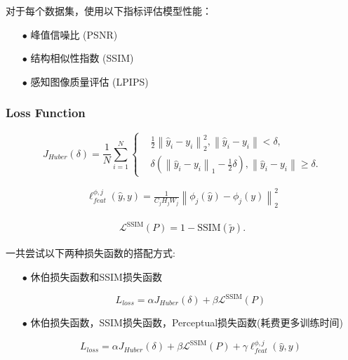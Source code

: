 \documentclass[a4paper, 10pt]{article}
\begin{document}
		对于每个数据集，使用以下指标评估模型性能：
		
		\begin{itemize}
			\item[$\bullet$]
			峰值信噪比 (PSNR)
			\item[$\bullet$]
			结构相似性指数 (SSIM)
			\item[$\bullet$]
			感知图像质量评估 (LPIPS)
		\end{itemize}
				
		\subsubsection{Loss Function}
		
		\begin{equation}
			J_{Huber}(\delta)= \frac{1}{N}\sum_{i=1}^{N}
			\left\{
			\begin{aligned}
				&\frac{1}{2}{\left\|\hat{y}_i - y_i \right\|}_2^{2}, \left\| \hat{y}_i -y_i \right\| < \delta , \\
				&\delta\left({\left\|\hat{y}_i - y_i \right\|}_1 - \frac{1}{2}\delta \right), \left\| \hat{y}_i -y_i \right\| \geq \delta.
			\end{aligned}
			\right.
			\label{eq: huber loss}
		\end{equation}
		
		\begin{equation}
			\begin{aligned}
				\ell_{feat}^{\phi,j} (\hat{y},y) = \frac{1}{C_{j}H_{j}W_{j}}{\left\| \phi_{j}(\hat{y})-\phi_{j}(y)\right\|}_{2}^2
			\end{aligned}
			\label{eq: perceptual loss}
		\end{equation}
		
		\begin{equation}
			\begin{aligned}
				\mathcal{L}^{\text{SSIM}}(P)=1-\text{SSIM}(\tilde{p}).
			\end{aligned}
			\label{eq: revised_SSIM loss}
		\end{equation}
		
		
		一共尝试以下两种损失函数的搭配方式:
		
		\begin{itemize}
			\item[$\bullet$]
			休伯损失函数和SSIM损失函数
			
			\begin{equation}
				L_{loss} = \alpha J_{Huber}(\delta) + \beta \mathcal{L}^{\text{SSIM}}(P)
			\end{equation}
			
			\item[$\bullet$]
			休伯损失函数，SSIM损失函数，Perceptual损失函数(耗费更多训练时间)
			
			\begin{equation}
				L_{loss} = \alpha J_{Huber}(\delta) + \beta \mathcal{L}^{\text{SSIM}}(P) + \gamma \ell_{feat}^{\phi,j} (\hat{y},y)
			\end{equation}
		\end{itemize}
		
\end{document}
